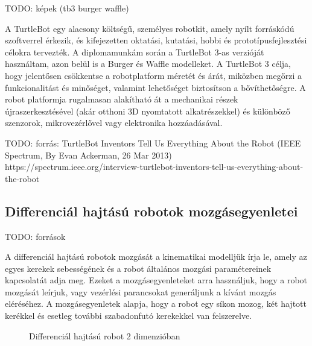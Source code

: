 TODO: képek (tb3 burger waffle)

A TurtleBot egy alacsony költségű, személyes robotkit, amely nyílt forráskódú szoftverrel érkezik, és kifejezetten oktatási, kutatási, hobbi és prototípusfejlesztési célokra tervezték. A diplomamunkám során a TurtleBot 3-as verzióját használtam, azon belül is a Burger és Waffle modelleket. A TurtleBot 3 célja, hogy jelentősen csökkentse a robotplatform méretét és árát, miközben megőrzi a funkcionalitást és minőséget, valamint lehetőséget biztosítson a bővíthetőségre. A robot platformja rugalmasan alakítható át a mechanikai részek újraszerkesztésével (akár otthoni 3D nyomtatott alkatrészekkel) és különböző szenzorok, mikrovezérlővel vagy elektronika hozzáadásával.

TODO: forrás: TurtleBot Inventors Tell Us Everything About the Robot (IEEE Spectrum, By Evan Ackerman, 26 Mar 2013)
https://spectrum.ieee.org/interview-turtlebot-inventors-tell-us-everything-about-the-robot

\subsection{Differenciál hajtású robotok mozgásegyenletei}
TODO: források

A differenciál hajtású robotok mozgását a kinematikai modelljük írja le, amely az egyes kerekek sebességének és a robot általános mozgási paramétereinek kapcsolatát adja meg. Ezeket a mozgásegyenleteket arra használjuk, hogy a robot mozgását leírjuk, vagy vezérlési parancsokat generáljunk a kívánt mozgás eléréséhez. A mozgásegyenletek alapja, hogy a robot egy síkon mozog, két hajtott kerékkel és esetleg további szabadonfutó kerekekkel van felszerelve.

\begin{figure}[!ht]
    \centering
    
    \caption{Differenciál hajtású robot 2 dimenzióban \cite{ros2_control_docs}}
    \label{fig:022_diff_drive}
\end{figure}

